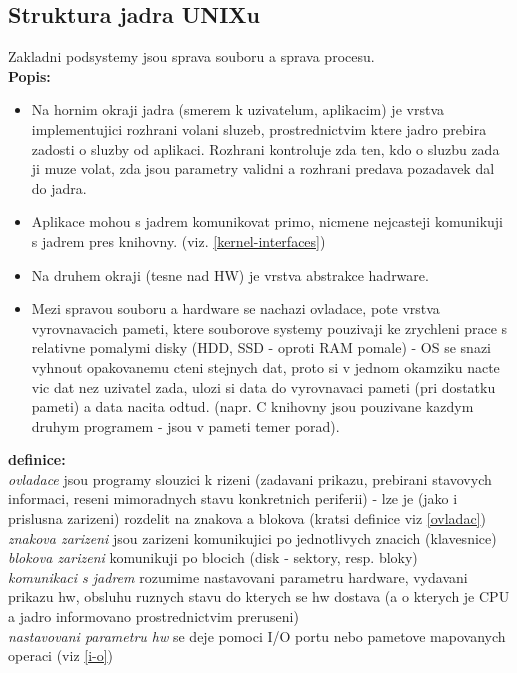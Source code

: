 \documentclass[a4paper, 11pt]{article}
\begin{document}
\newpage

\subsection{Struktura jadra UNIXu}
Zakladni podsystemy jsou sprava souboru a sprava procesu. \\
\textbf{Popis:}
\begin{itemize}
    \item Na hornim okraji jadra (smerem k uzivatelum, aplikacim) je vrstva implementujici rozhrani volani sluzeb, prostrednictvim ktere jadro prebira zadosti o sluzby od aplikaci. Rozhrani kontroluje zda ten, kdo o sluzbu zada ji muze volat, zda jsou parametry validni a rozhrani predava pozadavek dal do jadra.
    \item Aplikace mohou s jadrem komunikovat primo, nicmene nejcasteji komunikuji s jadrem pres knihovny. (viz. \ref{kernel-interfaces})
    \item Na druhem okraji (tesne nad HW) je vrstva abstrakce hadrware.
    \item Mezi spravou souboru a hardware se nachazi ovladace, pote vrstva vyrovnavacich pameti, ktere souborove systemy pouzivaji ke zrychleni prace s relativne pomalymi disky (HDD, SSD - oproti RAM pomale) - OS se snazi vyhnout opakovanemu cteni stejnych dat, proto si v jednom okamziku nacte vic dat nez uzivatel zada, ulozi si data do vyrovnavaci pameti (pri dostatku pameti) a data nacita odtud. (napr. C knihovny jsou pouzivane kazdym druhym programem - jsou v pameti temer porad). \\
\end{itemize}

\noindent\textbf{definice:} \\[0.5em] \label{ovladace}
\textit{ovladace} jsou programy slouzici k rizeni (zadavani prikazu, prebirani stavovych informaci, reseni mimoradnych stavu konkretnich periferii) - lze je (jako i prislusna zarizeni) rozdelit na znakova a blokova (kratsi definice viz \ref{ovladac}) \\[0.2em]
\textit{znakova zarizeni} jsou zarizeni komunikujici po jednotlivych znacich (klavesnice) \\[0.2em]
\textit{blokova zarizeni} komunikuji po blocich (disk - sektory, resp. bloky) \\[0.2em]
\textit{komunikaci s jadrem} rozumime nastavovani parametru hardware, vydavani prikazu hw, obsluhu ruznych stavu do kterych se hw dostava (a o kterych je CPU a jadro informovano prostrednictvim preruseni) \\[0.2em]
\textit{nastavovani parametru hw} se deje pomoci I/O portu nebo pametove mapovanych operaci (viz \ref{i-o}) \\[0.2em]
\end{document}
